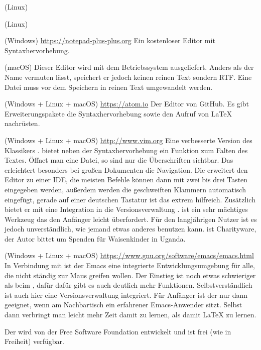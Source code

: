 \begin{labeling}{}
\item[\Program{kwrite}] (Linux) 

\item[\Program{kate}] (Linux)

\item[\Program{Notepad++}] (Windows) \url{https://notepad-plus-plus.org} Ein
  kostenloser Editor mit Syntaxhervorhebung.  

\item[\Program{TextEdit}]
  (macOS) Dieser Editor wird mit dem Betriebssystem ausgeliefert.  Anders
  als der Name vermuten lässt, speichert er jedoch keinen reinen Text
  sondern RTF.  Eine Datei muss vor dem Speichern in reinen Text umgewandelt
  werden.

\item[\Program{Atom}] (Windows + Linux + macOS)
  \url{https://atom.io} Der Editor von GitHub.  Es gibt Erweiterungspakete
  die Syntaxhervorhebung sowie den Aufruf von \LaTeX{} nachrüsten.

\item[\Program{Vim}] (Windows + Linux + macOS) \url{http://www.vim.org} Eine
  verbesserte Version des Klassikers .  bietet
  neben der Syntaxhervorhebung ein Funktion zum Falten des Textes. Öffnet
  man eine Datei, so sind nur die Überschriften sichtbar. Das erleichtert
  besonders bei großen Dokumenten die Navigation.  Die
   erweitert den Editor zu einer IDE, die meisten
  Befehle können dann mit zwei bis drei Tasten eingegeben werden, außerdem
  werden die geschweiften Klammern automatisch eingefügt, gerade auf einer
  deutschen Tastatur ist das extrem hilfreich.  Zusätzlich bietet er mit
   eine Integration in die Versionsverwaltung
  .   ist ein sehr mächtiges Werkzeug das den
  Anfänger leicht überfordert.  Für den langjährigen Nutzer ist es jedoch
  unverständlich, wie jemand etwas anderes benutzen kann.   ist
  Charityware, der Autor bittet um Spenden für Waisenkinder in Uganda.

\item[\Program{Emacs}] (Windows + Linux + macOS) 
  \url{https://www.gnu.org/software/emacs/emacs.html} In Verbindung mit
   ist der Emacs eine integrierte Entwicklungsumgebung
  für alle, die nicht ständig zur Maus greifen wollen.  Der Einstieg ist
  noch etwas schwieriger als beim , dafür dafür gibt es auch
  deutlich mehr Funktionen. Selbstverständlich ist auch hier eine
  Versionsverwaltung integriert.  Für Anfänger ist der  nur
  dann geeignet, wenn am Nachbartisch ein erfahrener Emacs-Anwender sitzt.
  Selbst dann verbringt man leicht mehr Zeit damit  zu
  lernen, als damit \LaTeX{} zu lernen.
  
  Der  wird von der Free Software Foundation entwickelt
  und ist frei (wie in Freiheit) verfügbar.
\end{labeling}

